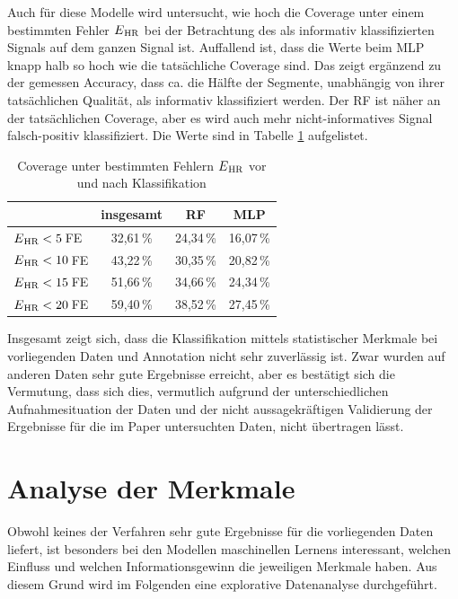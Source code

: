  Auch für diese Modelle wird untersucht, wie hoch die Coverage unter einem bestimmten Fehler $E\textsubscript{HR}$ bei der Betrachtung des als informativ klassifizierten Signals auf dem ganzen Signal ist. Auffallend ist, dass die Werte beim \ac{MLP} knapp halb so hoch wie die tatsächliche Coverage sind. Das zeigt ergänzend zu der gemessen Accuracy, dass ca. die Hälfte der Segmente, unabhängig von ihrer tatsächlichen Qualität, als informativ klassifiziert werden. Der \ac{RF} ist näher an der tatsächlichen Coverage, aber es wird auch mehr nicht-informatives Signal falsch-positiv klassifiziert. Die Werte sind in Tabelle \ref{fig:ml-statistical-coverage} aufgelistet.
 
  \begin{table}[H]
 	\centering
  	\begin{tabular}{l || c | c | c}
 											& insgesamt 		& RF			& MLP\\\hline
 		$E\textsubscript{HR} < 5$\,\si{FE} 	&  32{,}61\,\% 	& 24,34\,\%	& 16,07\,\%	\\
 		$E\textsubscript{HR} < 10$\,\si{FE} 	&  43{,}22\,\% 	& 30,35\,\% 	& 20,82\,\%	\\
 		$E\textsubscript{HR} < 15$\,\si{FE} 	&  51{,}66\,\% 	& 34,66\,\% 	& 24,34\,\%	\\
 		$E\textsubscript{HR} < 20$\,\si{FE} 	&  59{,}40\,\% 	& 38,52\,\% 	& 27,45\,\%\\
 	\end{tabular}
 	\caption[Coverage unter bestimmten Fehlern $E\textsubscript{HR}$ vor und nach Klassifikation mittels statistischen Merkmalen]{Coverage unter bestimmten Fehlern $E\textsubscript{HR}$ vor und nach Klassifikation}
 	\label{fig:ml-statistical-coverage}
 \end{table}
 
 Insgesamt zeigt sich, dass die Klassifikation mittels statistischer Merkmale bei vorliegenden Daten und Annotation nicht sehr zuverlässig ist. Zwar wurden auf anderen Daten sehr gute Ergebnisse erreicht, aber es bestätigt sich die Vermutung, dass sich dies, vermutlich aufgrund der unterschiedlichen Aufnahmesituation der Daten und der nicht aussagekräftigen Validierung der Ergebnisse für die im Paper untersuchten Daten, nicht übertragen lässt. 
 
\section{Analyse der Merkmale}

Obwohl keines der Verfahren sehr gute Ergebnisse für die vorliegenden Daten liefert, ist besonders bei den Modellen maschinellen Lernens interessant, welchen Einfluss und welchen Informationsgewinn die jeweiligen Merkmale haben. Aus diesem Grund wird im Folgenden eine explorative Datenanalyse durchgeführt.

